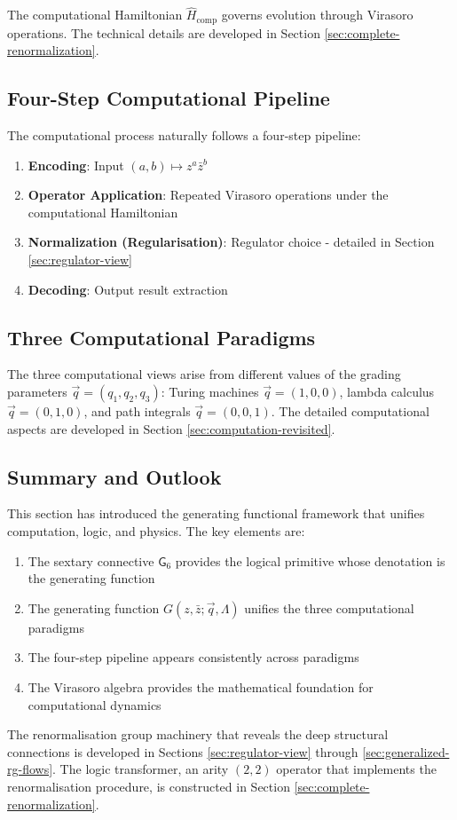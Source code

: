 The computational Hamiltonian $\hat H_{\text{comp}}$ governs evolution through Virasoro operations. The technical details are developed in Section \ref{sec:complete-renormalization}.


\subsection{Four-Step Computational Pipeline}

The computational process naturally follows a four-step pipeline:
\begin{enumerate}
\item \textbf{Encoding}: Input $(a,b) \mapsto z^a \bar{z}^b$
\item \textbf{Operator Application}: Repeated Virasoro operations under the computational Hamiltonian
\item \textbf{Normalization (Regularisation)}: Regulator choice - detailed in Section \ref{sec:regulator-view}
\item \textbf{Decoding}: Output result extraction
\end{enumerate}

\subsection{Three Computational Paradigms}

The three computational views arise from different values of the grading parameters $\vec{q} = (q_1, q_2, q_3)$: Turing machines $\vec{q} = (1, 0, 0)$, lambda calculus $\vec{q} = (0, 1, 0)$, and path integrals $\vec{q} = (0, 0, 1)$. The detailed computational aspects are developed in Section \ref{sec:computation-revisited}.

\subsection{Summary and Outlook}

This section has introduced the generating functional framework that unifies computation, logic, and physics. The key elements are:

\begin{enumerate}
\item The sextary connective $\mathsf{G}_6$ provides the logical primitive whose denotation is the generating function
\item The generating function $G(z, \bar{z}; \vec{q}, \Lambda)$ unifies the three computational paradigms
\item The four-step pipeline appears consistently across paradigms
\item The Virasoro algebra provides the mathematical foundation for computational dynamics
\end{enumerate}

The renormalisation group machinery that reveals the deep structural connections is developed in Sections \ref{sec:regulator-view} through \ref{sec:generalized-rg-flows}. The logic transformer, an arity $(2,2)$ operator that implements the renormalisation procedure, is constructed in Section \ref{sec:complete-renormalization}.
